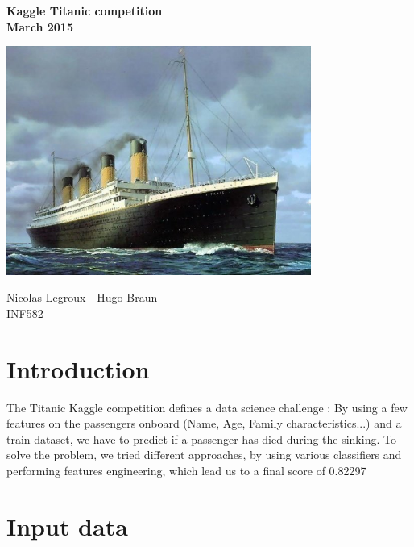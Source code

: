 \documentclass[a4paper,10pt]{report}
\begin{document}
\begin{titlepage}
    \centering
        {\bfseries\Large
        Kaggle Titanic competition\\
        March 2015
        
    }  
     \vfill
     \includegraphics[width=10cm]{titanic.jpg} %
    \vfill
    {\bfseries\Large

        Nicolas Legroux - Hugo Braun\\
        \vskip2cm
        INF582
    }    
    \vfill
   
  
\end{titlepage}

\section*{Introduction}
The Titanic Kaggle competition defines a data science challenge : By using a few features on the passengers onboard
(Name, Age, Family characteristics...) and a train dataset, we have to predict if a passenger has died during the sinking. 
To solve the problem, we tried different approaches, by using various classifiers and performing features engineering,
which lead us to a final score of 0.82297

\section{Input data}
\end{document}
